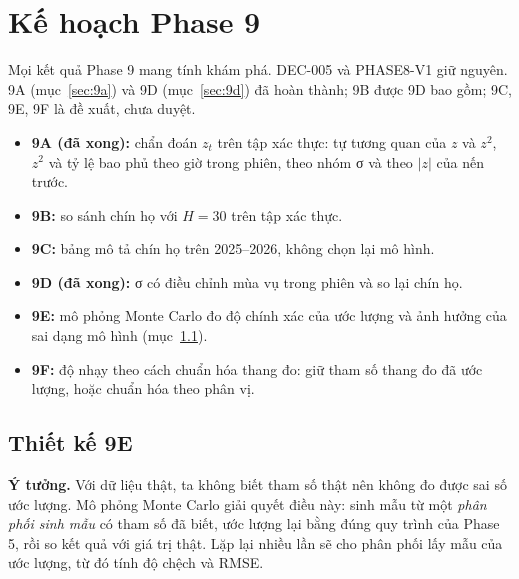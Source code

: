 \documentclass[11pt,a4paper]{article}
\begin{document}
\section{Kế hoạch Phase 9}

Mọi kết quả Phase 9 mang tính khám phá. DEC-005 và PHASE8-V1 giữ nguyên. 9A (mục~\ref{sec:9a}) và 9D (mục~\ref{sec:9d}) đã hoàn thành; 9B được 9D bao gồm; 9C, 9E, 9F là đề xuất, chưa duyệt.

\begin{itemize}[nosep]
\item \textbf{9A (đã xong):} chẩn đoán $z_t$ trên tập xác thực: tự tương quan của $z$ và $z^2$, $z^2$ và tỷ lệ bao phủ theo giờ trong phiên, theo nhóm σ và theo $|z|$ của nến trước.
\item \textbf{9B:} so sánh chín họ với $H=30$ trên tập xác thực.
\item \textbf{9C:} bảng mô tả chín họ trên 2025--2026, không chọn lại mô hình.
\item \textbf{9D (đã xong):} σ có điều chỉnh mùa vụ trong phiên và so lại chín họ.
\item \textbf{9E:} mô phỏng Monte Carlo đo độ chính xác của ước lượng và ảnh hưởng của sai dạng mô hình (mục~\ref{sec:9e}).
\item \textbf{9F:} độ nhạy theo cách chuẩn hóa thang đo: giữ tham số thang đo đã ước lượng, hoặc chuẩn hóa theo phân vị.
\end{itemize}

\subsection{Thiết kế 9E}
\label{sec:9e}

\textbf{Ý tưởng.} Với dữ liệu thật, ta không biết tham số thật nên không đo được sai số ước lượng. Mô phỏng Monte Carlo giải quyết điều này: sinh mẫu từ một \emph{phân phối sinh mẫu} có tham số đã biết, ước lượng lại bằng đúng quy trình của Phase 5, rồi so kết quả với giá trị thật. Lặp lại nhiều lần sẽ cho phân phối lấy mẫu của ước lượng, từ đó tính độ chệch và RMSE.
\end{document}
